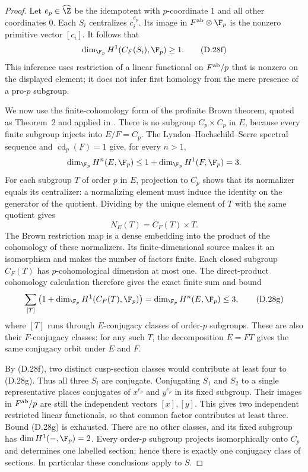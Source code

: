 \begin{proof}
Let $e_p\in\widehat\Z$ be the idempotent with
$p$-coordinate $1$ and all other coordinates $0$.
Each $S_i$ centralizes $c_i^{e_p}$. Its image in
$F^{\rm ab}\otimes\F_p$ is the nonzero primitive vector
$[c_i]$. It follows that
\[
       \dim_{\F_p}H^1(C_F(S_i),\F_p)\ge1.
                                                               \tag{D.28f}
\]
This inference uses restriction of a linear functional
on $F^{\rm ab}/p$ that is nonzero on the displayed
element; it does not infer first homology from the mere
presence of a pro-$p$ subgroup.

We now use the finite-cohomology form of the profinite
Brown theorem, quoted as Theorem~2 and applied in
\cite[\S1.1, equations (1)--(6)]{A-KochloukovaZalesskii2007}.
There is no subgroup $C_p\times C_p$ in $E$, because
every finite subgroup injects into $E/F=C_p$.
The Lyndon--Hochschild--Serre spectral sequence and
$\operatorname{cd}_p(F)=1$ give, for every $n>1$,
\[
 \dim_{\F_p}H^n(E,\F_p)\le
             1+\dim_{\F_p}H^1(F,\F_p)=3.
\]
For each subgroup $T$ of order $p$ in $E$, projection
to $C_p$ shows that its normalizer equals its centralizer:
a normalizing element must induce the identity on the
generator of the quotient. Dividing by the unique element
of $T$ with the same quotient gives
\[
                 N_E(T)=C_F(T)\times T.
\]
The Brown restriction map is a dense embedding into the
product of the cohomology of these normalizers. Its
finite-dimensional source makes it an isomorphism and
makes the number of factors finite. Each closed subgroup
$C_F(T)$ has $p$-cohomological dimension at most one.
The direct-product cohomology calculation therefore gives
the exact finite sum and bound
\[
 \sum_{[T]}
    \left(1+\dim_{\F_p}H^1(C_F(T),\F_p)\right)
       =\dim_{\F_p}H^n(E,\F_p)\le3,
                                                               \tag{D.28g}
\]
where $[T]$ runs through $E$-conjugacy classes of order-$p$
subgroups. These are also their $F$-conjugacy classes:
for any such $T$, the decomposition $E=FT$ gives the
same conjugacy orbit under $E$ and $F$.

By (D.28f), two distinct cusp-section classes would
contribute at least four to (D.28g). Thus all three
$S_i$ are conjugate. Conjugating $S_1$ and $S_2$ to a
single representative places conjugates of
$x^{e_p}$ and $y^{e_p}$ in its fixed subgroup.
Their images in $F^{\rm ab}/p$ are still the independent
vectors $[x],[y]$. This gives two independent restricted
linear functionals, so that common factor contributes
at least three. Bound (D.28g) is exhausted. There are
no other classes, and its fixed subgroup has
$\dim H^1(-,\F_p)=2$. Every order-$p$ subgroup projects
isomorphically onto $C_p$ and determines one labelled
section; hence there is exactly one conjugacy class of
sections. In particular these conclusions apply to $S$.


\end{proof}
